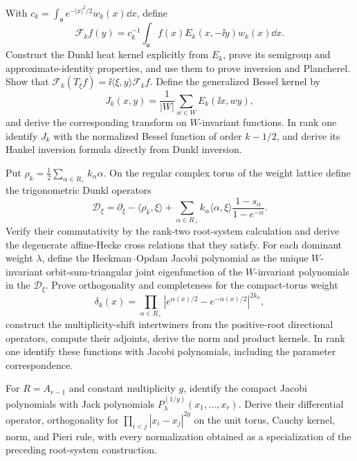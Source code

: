 \begin{exercise}
With
$c_k=\int_{\mathfrak a}e^{-|x|^2/2}w_k(x)\dd x$, define
\[
 \mathcal F_kf(y)=c_k^{-1}\int_{\mathfrak a}
 f(x)E_k(x,-\ii y)w_k(x)\dd x.
\]
Construct the Dunkl heat kernel explicitly from $E_k$, prove its semigroup
and approximate-identity properties, and use them to prove inversion and
Plancherel.  Show that
$\mathcal F_k(T_\xi f)=\ii\langle\xi,y\rangle\mathcal F_kf$.
Define the generalized Bessel kernel by
\[
 J_k(x,y)=\frac1{|W|}\sum_{w\in W}E_k(\ii x,wy),
\]
and derive the corresponding transform on $W$-invariant functions.  In rank
one identify $J_k$ with the normalized Bessel function of order $k-1/2$,
and derive its Hankel inversion formula directly from Dunkl inversion.
\end{exercise}

\begin{exercise}
Put $\rho_k=\tfrac12\sum_{\alpha\in R_+}k_\alpha\alpha$.  On the regular
complex torus of the weight lattice define the trigonometric Dunkl operators
\[
 \mathcal D_\xi=\partial_\xi-\langle\rho_k,\xi\rangle
 +\sum_{\alpha\in R_+}k_\alpha\langle\alpha,\xi\rangle
 \frac{1-s_\alpha}{1-e^{-\alpha}}.
\]
Verify their commutativity by the rank-two root-system calculation and derive
the degenerate affine-Hecke cross relations that they satisfy.  For each
dominant weight $\lambda$, define the Heckman--Opdam Jacobi polynomial as the
unique $W$-invariant orbit-sum-triangular joint eigenfunction of the
$W$-invariant polynomials in the $\mathcal D_\xi$.  Prove orthogonality and
completeness for the compact-torus weight
\[
 \delta_k(x)=\prod_{\alpha\in R_+}
 |e^{\alpha(x)/2}-e^{-\alpha(x)/2}|^{2k_\alpha},
\]
construct the multiplicity-shift intertwiners from the positive-root
directional operators, compute their adjoints, derive the norm and product
kernels.  In rank one identify these functions with Jacobi polynomials,
including the parameter correspondence.

For $R=A_{r-1}$ and constant multiplicity $g$, identify the compact Jacobi
polynomials with Jack polynomials
$P_\lambda^{(1/g)}(x_1,\ldots,x_r)$.  Derive their differential operator,
orthogonality for
$\prod_{i<j}|x_i-x_j|^{2g}$ on the unit torus, Cauchy kernel, norm, and Pieri
rule, with every normalization obtained as a specialization of the preceding
root-system construction.
\end{exercise}

